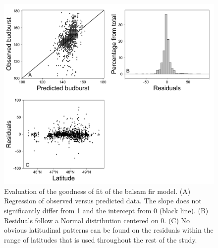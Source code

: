 \documentclass[12 pt]{article}
\begin{document}
\begin{figure}[ht]
\begin{center}
\renewcommand{\thefigure}{S\arabic{figure}}
\includegraphics[width = 16 cm, keepaspectratio]{Fitting_Plots}
\caption{\doublespacing Evaluation of the goodness of fit of the balsam fir model. (A) Regression of observed versus predicted data. The slope does not significantly differ from 1 and the intercept from 0 (black line). (B) Residuals follow a Normal distribution centered on 0. (C) No obvious latitudinal patterns can be found on the residuals within the range of latitudes that is used throughout the rest of the study.}
\end{center}
\end{figure}
\end{document}
